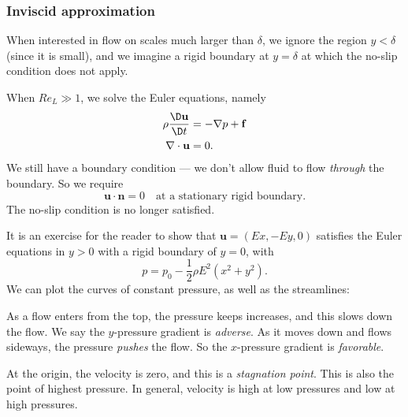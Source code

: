 \documentclass[a4paper]{article}
\begin{document}
\subsubsection{Inviscid approximation}
When interested in flow on scales much larger than $\delta$, we ignore the region $y < \delta$ (since it is small), and we imagine a rigid boundary at $y = \delta$ at which the no-slip condition does not apply.

When $Re_L \gg 1$, we solve the Euler equations, namely
\begin{align*}
  \rho \frac{\D \mathbf{u}}{\D t} &= - \nabla p + \mathbf{f}\\
  \nabla \cdot \mathbf{u} &= 0.
\end{align*}
We still have a boundary condition --- we don't allow fluid to flow \emph{through} the boundary. So we require
\[
  \mathbf{u}\cdot \mathbf{n} = 0\quad\text{at a stationary rigid boundary}.
\]
The no-slip condition is no longer satisfied.

It is an exercise for the reader to show that $\mathbf{u} = (Ex, -Ey, 0)$ satisfies the Euler equations in $y > 0$ with a rigid boundary of $y = 0$, with
\[
  p = p_0 - \frac{1}{2} \rho E^2(x^2 + y^2).
\]
We can plot the curves of constant pressure, as well as the streamlines:
\begin{center}
\end{center}
As a flow enters from the top, the pressure keeps increases, and this slows down the flow. We say the $y$-pressure gradient is \emph{adverse}. As it moves down and flows sideways, the pressure \emph{pushes} the flow. So the $x$-pressure gradient is \emph{favorable}.

At the origin, the velocity is zero, and this is a \emph{stagnation point}. This is also the point of highest pressure. In general, velocity is high at low pressures and low at high pressures.
\end{document}
